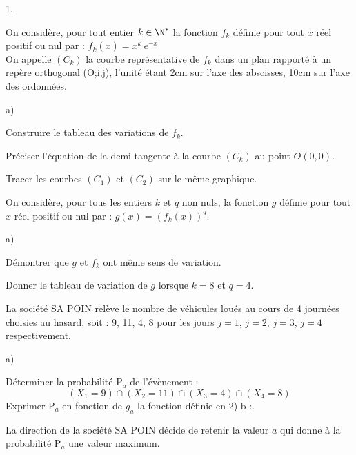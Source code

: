 \documentclass[11pt]{article}%
\begin{document}
\begin{noliste}{1.}
 \setlength{\itemsep}{4mm}
\item On considère, pour tout entier $k\in \N^{\ast }$ la fonction
$f_{k}$ définie pour tout $x$ réel positif ou nul par : \qquad
$f_{k}(x) = x^{k}\ e^{-x}$\\
On appelle $(C_{k})$ la courbe représentative de $f_{k}$ dans un plan
rapporté à un repère orthogonal (O;i,j), l'unité étant 2cm sur l'axe
des abscisses,
10cm sur l'axe des ordonnées.

\begin{noliste}{a)}
 \setlength{\itemsep}{2mm}
\item Construire le tableau des variations de $f_{k}$.

\item Préciser l'équation de la demi-tangente à la courbe $(C_{k})$ au
point 
$O(0,0)$.

\item Tracer les courbes $(C_{1})$ et $(C_{2})$ sur le même graphique.
\end{noliste}

\item On considère, pour tous les entiers $k$ et $q$ non nuls, la
fonction $g $ définie pour tout $x$ réel positif ou nul par : \quad
$g(x) = \left(
f_{k}(x)\right) ^{q}$.

\begin{noliste}{a)}
 \setlength{\itemsep}{2mm}
\item Démontrer que $g$ et $f_{k}$ ont même sens de variation.

\item Donner le tableau de variation de $g$ lorsque $k = 8$ et $q = 4$.
\end{noliste}

\item La société SA POIN relève le nombre de véhicules loués au cours
de 4
journées choisies au hasard, soit : 9, 11, 4, 8 pour les jours $j = 1$,
$j = 2$, $j = 3$, $j = 4$ respectivement.

\begin{noliste}{a)}
 \setlength{\itemsep}{2mm}
\item Déterminer la probabilité P$_{a}$ de l'évènement : 
\[
(X_{1} = 9)\cap (X_{2} = 11)\cap (X_{3} = 4)\cap (X_{4} = 8)
\]
Exprimer P$_{a}$ en fonction de $g_{a}$ la fonction définie en 2) b :.

\item La direction de la société SA POIN décide de retenir la valeur
$a$ qui
donne à la probabilité P$_{a}$ une valeur maximum.


\end{noliste}
\end{noliste}
\end{document}
